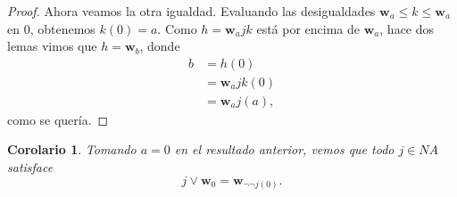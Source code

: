 \documentclass[12pt,letterpaper,titlepage]{article}
\newtheorem*{cor}{Corolario}
\theoremstyle{definition}
\renewcommand\sup{\vee}
\newcommand\wnuc[1]{\mathbf w_{#1}}
\newcommand\<{\langle}
\renewcommand\>{\rangle}
\begin{document}
\begin{proof}
    Ahora veamos la otra igualdad.
    Evaluando las desigualdades $\wnuc a\leq k\leq \wnuc a$
    en $0$, obtenemos $k(0)=a$.
    Como $h=\wnuc ajk$ está por encima de $\wnuc a$,
    hace dos lemas vimos que $h=\wnuc b$, donde
    \begin{align*}
        b
        &= h(0) \\
        &= \wnuc ajk(0) \\
        &= \wnuc aj(a),
    \end{align*}
    como se quería.
\end{proof}

\begin{cor}
    Tomando $a=0$ en el resultado anterior,
    vemos que todo $j\in NA$ satisface
    \[
        j\sup\wnuc 0 = \wnuc{\neg\neg j(0)}
    .\]
\end{cor}
\end{document}
